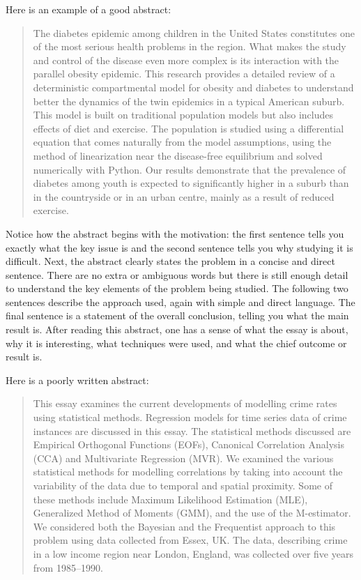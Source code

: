 Here is an example of a good abstract:

\begin{quote}
The diabetes epidemic among children in the United States constitutes one of the most serious health problems in the region. What makes the study and control of the disease even more complex is its interaction with the parallel obesity epidemic. This research provides a detailed review of a deterministic compartmental model for obesity and diabetes to understand better the dynamics of the twin epidemics in a typical American suburb. This model is built on traditional population models but also includes effects of diet and exercise. The population is studied using a differential equation that comes naturally from the model assumptions, using the method of linearization near the disease-free equilibrium and solved numerically with Python. Our results demonstrate that the prevalence of diabetes among youth is expected to significantly higher in a suburb than in the countryside or in an urban centre, mainly as a result of reduced exercise.
\end{quote}

Notice how the abstract begins with the motivation: the first sentence tells you exactly what the key issue is and the second sentence tells you why studying it is difficult. Next, the abstract clearly states the problem in a concise and direct sentence. There are no extra or ambiguous words but there is still enough detail to understand the key elements of the problem being studied. The following two sentences describe the approach used, again with simple and direct language. The final sentence is a statement of the overall conclusion, telling you what the main result is. After reading this abstract, one has a sense of what the essay is about, why it is interesting, what techniques were used, and what the chief outcome or result is.

Here is a poorly written abstract:

\begin{quote}
This essay examines the current developments of modelling crime rates using statistical methods. Regression models for time series data of crime instances are discussed in this essay. The statistical methods discussed are Empirical Orthogonal Functions (EOFs), Canonical Correlation Analysis (CCA) and Multivariate Regression (MVR). We examined the various statistical methods for modelling correlations by taking into account the variability of the data due to temporal and spatial proximity. Some of these methods include Maximum Likelihood Estimation (MLE), Generalized Method of Moments (GMM), and the use of the M-estimator. We considered both the Bayesian and the Frequentist approach to this problem using data collected from Essex, UK. The data, describing crime in a low income region near London, England, was collected over five years from 1985--1990.
\end{quote}

